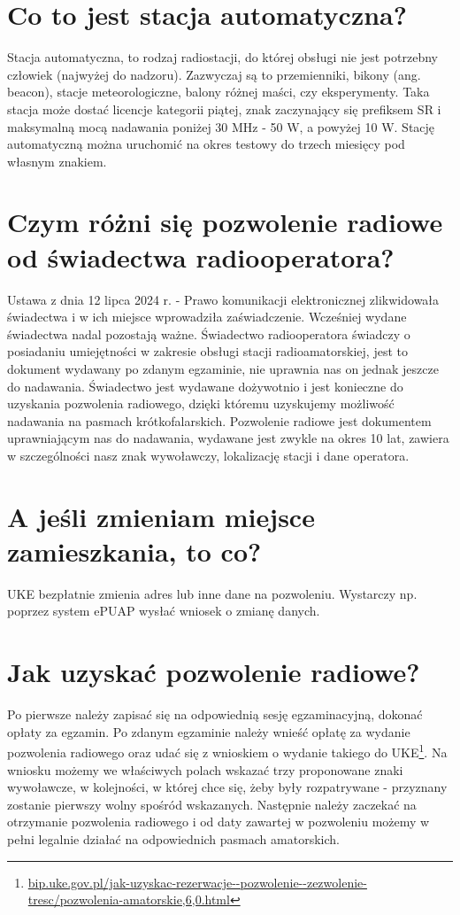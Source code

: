 \documentclass[a4paper,12pt]{article}
\begin{document}
\section{Co to jest stacja automatyczna?}
Stacja automatyczna, to rodzaj radiostacji, do której obsługi nie jest potrzebny człowiek (najwyżej do nadzoru). Zazwyczaj są to przemienniki, bikony (ang. beacon), stacje meteorologiczne, balony różnej maści, czy eksperymenty. Taka stacja może dostać licencje kategorii piątej, znak zaczynający się prefiksem SR i maksymalną mocą nadawania poniżej 30 MHz - 50 W, a powyżej 10 W.
Stację automatyczną można uruchomić na okres testowy do trzech miesięcy pod własnym znakiem.

\section{Czym różni się pozwolenie radiowe od świadectwa radiooperatora?}
Ustawa z dnia 12 lipca 2024 r. - Prawo komunikacji elektronicznej zlikwidowała świadectwa i w ich miejsce wprowadziła zaświadczenie. Wcześniej wydane świadectwa nadal pozostają ważne.
Świadectwo radiooperatora świadczy o posiadaniu umiejętności w zakresie obsługi stacji radioamatorskiej, jest to dokument wydawany po zdanym egzaminie, nie uprawnia nas on jednak jeszcze do nadawania. Świadectwo jest wydawane dożywotnio i jest konieczne do uzyskania pozwolenia radiowego, dzięki któremu uzyskujemy możliwość nadawania na pasmach krótkofalarskich. Pozwolenie radiowe jest dokumentem uprawniającym nas do nadawania, wydawane jest zwykle na okres 10 lat, zawiera w szczególności nasz znak wywoławczy, lokalizację stacji i dane operatora.

\section{A jeśli zmieniam miejsce zamieszkania, to co?}
UKE bezpłatnie zmienia adres lub inne dane na pozwoleniu. Wystarczy np. poprzez system ePUAP wysłać wniosek o zmianę danych. 

\section{Jak uzyskać pozwolenie radiowe?}
Po pierwsze należy zapisać się na odpowiednią sesję egzaminacyjną, dokonać opłaty za egzamin. Po zdanym egzaminie należy wnieść opłatę za wydanie pozwolenia radiowego oraz udać się z wnioskiem o wydanie takiego do UKE\footnote{\url{bip.uke.gov.pl/jak-uzyskac-rezerwacje--pozwolenie--zezwolenie-tresc/pozwolenia-amatorskie,6,0.html}}. Na wniosku możemy we właściwych polach wskazać trzy proponowane znaki wywoławcze, w kolejności, w której chce się, żeby były rozpatrywane - przyznany zostanie pierwszy wolny spośród wskazanych. Następnie należy zaczekać na otrzymanie pozwolenia radiowego i od daty zawartej w pozwoleniu możemy w pełni legalnie działać na odpowiednich pasmach amatorskich.
\end{document}
